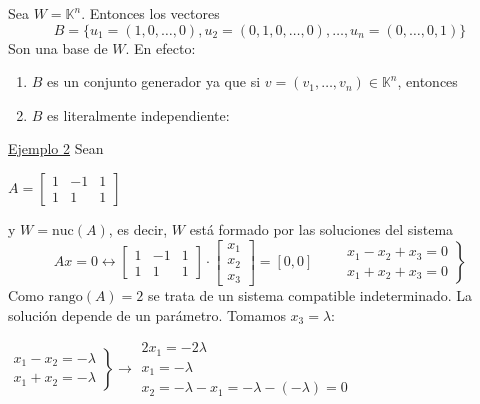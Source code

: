 \documentclass[12pt]{article}
\begin{document}
Sea $W=\mathbb{K}^n$. Entonces los vectores \[B=\{u_{1}=(1,0,\hdots,0),u_{2}=(0,1,0,\hdots,0),\hdots,u_n=(0,\hdots,0,1)\}\] 
Son una base de $W$. En efecto:
\begin{enumerate}[label=\arabic*)]
    \item $B$ es un conjunto generador ya que si $v=(v_1,\hdots,v_n)\in \mathbb{K}^n$, entonces \begin{center}
    \end{center}
    \item $B$ es literalmente independiente: \begin{center}
    \end{center}
\end{enumerate}
\underline{Ejemplo 2}
Sean 

$A=\begin{bmatrix}
1 & -1 & 1 \\ 
1 & 1 & 1
\end{bmatrix}$

y $W=\mathrm{nuc}(A)$, es decir, $W$ está formado por las soluciones del sistema \[Ax=0\longleftrightarrow\begin{bmatrix}
1 & -1 & 1 \\ 
1 & 1 & 1
\end{bmatrix}\cdot\begin{bmatrix}
x_{1}\\
x_2\\
x_3
\end{bmatrix}=[0,0]\qquad\left.\begin{array}{r}
x_1-x_2+x_3=0\\
x_1+x_2+x_3=0
\end{array}\right\rbrace \]
Como $\mathrm{rango}(A)=2$ se trata de un sistema compatible indeterminado. La solución depende de un parámetro. Tomamos $x_3=\lambda$:

$\left.\begin{array}{r}
x_1-x_2=-\lambda\\
x_1+x_2=-\lambda
\end{array}\right\rbrace\longrightarrow\begin{array}{l}
2x_1=-2\lambda\\
x_1=-\lambda\\
x_2=-\lambda-x_1=-\lambda-(-\lambda)=0
\end{array} $
\end{document}
